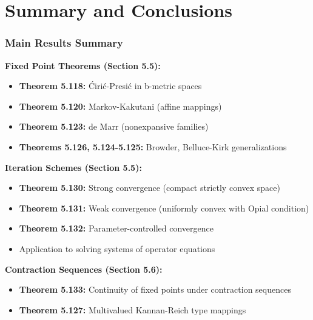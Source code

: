 \documentclass[aspectratio=169,10pt]{beamer}
\begin{document}
\section{Summary and Conclusions}

\begin{frame}
\frametitle{Main Results Summary}

\textbf{Fixed Point Theorems (Section 5.5):}
\begin{itemize}
    \item \textbf{Theorem 5.118:} Ćirić-Presić in b-metric spaces
    \item \textbf{Theorem 5.120:} Markov-Kakutani (affine mappings)
    \item \textbf{Theorem 5.123:} de Marr (nonexpansive families)
    \item \textbf{Theorems 5.126, 5.124-5.125:} Browder, Belluce-Kirk generalizations
\end{itemize}

\vspace{0.3cm}

\textbf{Iteration Schemes (Section 5.5):}
\begin{itemize}
    \item \textbf{Theorem 5.130:} Strong convergence (compact strictly convex space)
    \item \textbf{Theorem 5.131:} Weak convergence (uniformly convex with Opial condition)
    \item \textbf{Theorem 5.132:} Parameter-controlled convergence
    \item Application to solving systems of operator equations
\end{itemize}

\vspace{0.3cm}

\textbf{Contraction Sequences (Section 5.6):}
\begin{itemize}
    \item \textbf{Theorem 5.133:} Continuity of fixed points under contraction sequences
    \item \textbf{Theorem 5.127:} Multivalued Kannan-Reich type mappings
\end{itemize}

\end{frame}
\end{document}
